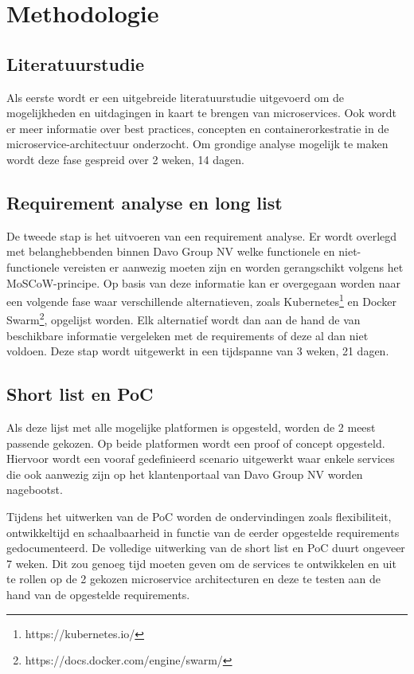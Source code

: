 
\section{Methodologie}%
\label{sec:methodologie}
\subsection{Literatuurstudie}
Als eerste wordt er een uitgebreide literatuurstudie uitgevoerd om de mogelijkheden en uitdagingen in kaart te brengen van microservices. Ook wordt er meer informatie over best practices, concepten en containerorkestratie in de microservice-architectuur onderzocht. Om grondige analyse mogelijk te maken wordt deze fase gespreid over 2 weken, 14 dagen.
\subsection{Requirement analyse en long list}
De tweede stap is het uitvoeren van een requirement analyse. Er wordt overlegd met belanghebbenden binnen Davo Group NV welke functionele en niet-functionele vereisten er aanwezig moeten zijn en worden gerangschikt volgens het MoSCoW-principe. Op basis van deze informatie kan er overgegaan worden naar een volgende fase waar verschillende alternatieven, zoals Kubernetes\footnote{https://kubernetes.io/} en Docker Swarm\footnote{https://docs.docker.com/engine/swarm/}, opgelijst worden. Elk alternatief wordt dan aan de hand de van beschikbare informatie vergeleken met de requirements of deze al dan niet voldoen. Deze stap wordt uitgewerkt in een tijdspanne van 3 weken, 21 dagen.
\subsection{Short list en PoC}
Als deze lijst met alle mogelijke platformen is opgesteld, worden de 2 meest passende gekozen. Op beide platformen wordt een proof of concept opgesteld. Hiervoor wordt een vooraf gedefinieerd scenario uitgewerkt waar enkele services die ook aanwezig zijn op het klantenportaal van Davo Group NV worden nagebootst. 

Tijdens het uitwerken van de PoC worden de ondervindingen zoals flexibiliteit, ontwikkeltijd en schaalbaarheid in functie van de eerder opgestelde requirements gedocumenteerd. De volledige uitwerking van de short list en PoC duurt ongeveer 7 weken. Dit zou genoeg tijd moeten geven om de services te ontwikkelen en uit te rollen op de 2 gekozen microservice architecturen en deze te testen aan de hand van de opgestelde requirements.
